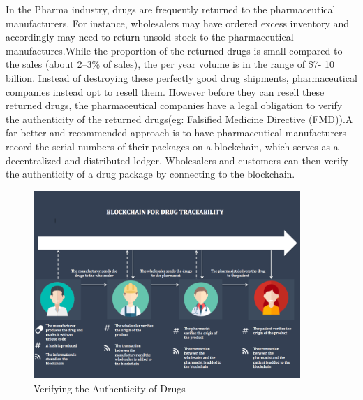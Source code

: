 \documentclass[12pt]{report}
\begin{document}
In the Pharma industry, drugs are frequently returned to the pharmaceutical manufacturers. For instance, wholesalers may have ordered excess inventory and accordingly may need to return unsold stock to the pharmaceutical manufactures.While the proportion of the returned drugs is small compared to the sales (about 2–3\% of sales), the per year volume is in the range of \$7- 10 billion\cite{14}.
Instead of destroying these perfectly good drug shipments, pharmaceutical companies instead opt to resell them. However before they can resell these returned drugs, the pharmaceutical companies have a legal obligation to verify the authenticity of the returned drugs(eg: Falsified Medicine Directive (FMD)).A far better and recommended approach is to have pharmaceutical manufacturers record the serial numbers of their packages on a blockchain, which serves as a decentralized and distributed ledger. Wholesalers and customers can then verify the authenticity of a drug package by connecting to the blockchain.
\begin{figure}[H]
\centering
\includegraphics[width=0.9\textwidth]{drug.png}
\caption{ Verifying the Authenticity of Drugs}
\label{drug}
\end{figure}
\end{document}

